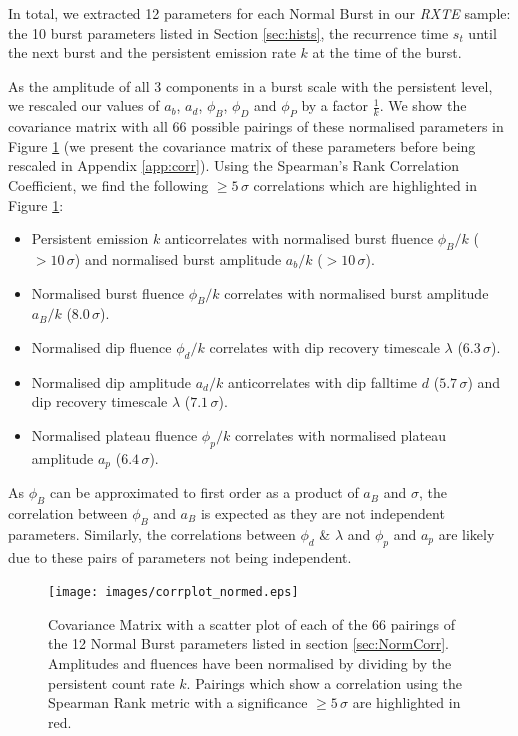 \label{sec:NormCorr}

\par In total, we extracted 12 parameters for each Normal Burst in our \textit{RXTE} sample: the 10 burst parameters listed in Section \ref{sec:hists}, the recurrence time $s_t$ until the next burst and the persistent emission rate $k$ at the time of the burst.  %
\par As the amplitude of all 3 components in a burst scale with the persistent level, we rescaled our values of $a_b$, $a_d$, $\phi_B$, $\phi_D$ and $\phi_P$ by a factor $\frac{1}{k}$.  We show the covariance matrix with all 66 possible pairings of these normalised parameters in Figure \ref{fig:corr_n} (we present the covariance matrix of these parameters before being rescaled in Appendix \ref{app:corr}).  Using the Spearman's Rank Correlation Coefficient, we find the following $\geq5\,\sigma$ correlations which are highlighted in Figure \ref{fig:corr_n}:

\begin{itemize}
\item Persistent emission $k$ anticorrelates with normalised burst fluence $\phi_B/k$ ($>10\,\sigma$) and normalised burst amplitude $a_b/k$ ($>10\,\sigma$).
\item Normalised burst fluence $\phi_B/k$ correlates with normalised burst amplitude $a_B/k$ ($8.0\,\sigma$).
\item Normalised dip fluence $\phi_d/k$ correlates with dip recovery timescale $\lambda$ ($6.3\,\sigma$).
\item Normalised dip amplitude $a_d/k$ anticorrelates with dip falltime $d$ ($5.7\,\sigma$) and dip recovery timescale $\lambda$ ($7.1\,\sigma$).
\item Normalised plateau fluence $\phi_p/k$ correlates with normalised plateau amplitude $a_p$ ($6.4\,\sigma$).
\end{itemize}

As $\phi_B$ can be approximated to first order as a product of $a_B$ and $\sigma$, the correlation between $\phi_B$ and $a_B$ is expected as they are not independent parameters.  Similarly, the correlations between $\phi_d$ \& $\lambda$ and $\phi_p$ and $a_p$ are likely due to these pairs of parameters not being independent.

\begin{figure}
  \centering
  \texttt{[image: images/corrplot\_normed.eps]}
  \caption[Covariance Matrix with a scatter plot of each pairing of the 12 normalised Normal Burst parameters listed in section \ref{sec:NormCorr}.]{\small Covariance Matrix with a scatter plot of each of the 66 pairings of the 12 Normal Burst parameters listed in section \ref{sec:NormCorr}.  Amplitudes and fluences have been normalised by dividing by the persistent count rate $k$.  Pairings which show a correlation using the Spearman Rank metric with a significance $\geq5\,\sigma$ are highlighted in red.}
  \label{fig:corr_n}
\end{figure}

